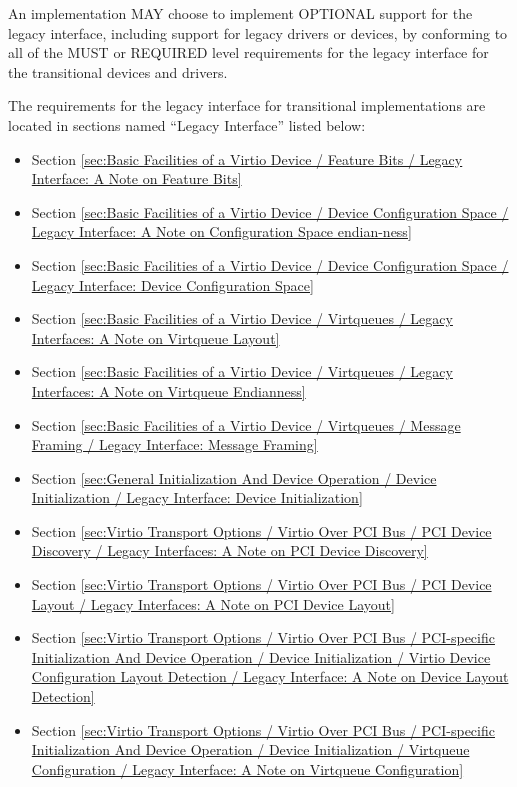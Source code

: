 An implementation MAY choose to implement OPTIONAL support for the
legacy interface, including support for legacy drivers
or devices, by conforming to all of the MUST or
REQUIRED level requirements for the legacy interface
for the transitional devices and drivers.

The requirements for the legacy interface for transitional implementations
are located in sections named ``Legacy Interface'' listed below:
\begin{itemize}
\item Section \ref{sec:Basic Facilities of a Virtio Device /
Feature Bits / Legacy Interface: A Note on Feature Bits}
\item Section \ref{sec:Basic Facilities of a Virtio Device / Device Configuration Space / Legacy Interface: A Note on Configuration Space endian-ness}
\item Section \ref{sec:Basic Facilities of a Virtio Device / Device Configuration Space / Legacy Interface: Device Configuration Space}
\item Section \ref{sec:Basic Facilities of a Virtio Device / Virtqueues / Legacy Interfaces: A Note on Virtqueue Layout}
\item Section \ref{sec:Basic Facilities of a Virtio Device / Virtqueues / Legacy Interfaces: A Note on Virtqueue Endianness}
\item Section \ref{sec:Basic Facilities of a Virtio Device / Virtqueues / Message Framing / Legacy Interface: Message Framing}
\item Section \ref{sec:General Initialization And Device Operation / Device Initialization / Legacy Interface: Device Initialization}
\item Section \ref{sec:Virtio Transport Options / Virtio Over PCI Bus / PCI Device Discovery / Legacy Interfaces: A Note on PCI Device Discovery}
\item Section \ref{sec:Virtio Transport Options / Virtio Over PCI Bus / PCI Device Layout / Legacy Interfaces: A Note on PCI Device Layout}
\item Section \ref{sec:Virtio Transport Options / Virtio Over PCI Bus / PCI-specific Initialization And Device Operation / Device Initialization / Virtio Device Configuration Layout Detection / Legacy Interface: A Note on Device Layout Detection}
\item Section \ref{sec:Virtio Transport Options / Virtio Over PCI Bus / PCI-specific Initialization And Device Operation / Device Initialization / Virtqueue Configuration / Legacy Interface: A Note on Virtqueue Configuration}

\end{itemize}
